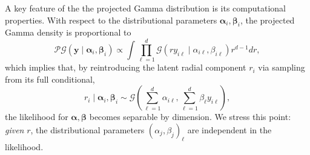 A key feature of the the projected Gamma distribution is its computational properties.  With respect to the distributional parameters $\bm{\alpha}_i,\bm{\beta}_i$, the projected Gamma density is proportional to
\begin{equation*}
    \mathcal{PG}(\bm{y}\mid\bm{\alpha}_i,\bm{\beta}_i) \propto \int\prod_{\ell = 1}^d\mathcal{G}\left(ry_{i\ell}\mid\alpha_{i\ell},\beta_{i\ell}\right)r^{d-1}dr,
\end{equation*}
which implies that, by reintroducing the latent radial component $r_i$ via sampling from its full conditional,
\begin{equation}
    r_i\mid\bm{\alpha}_i,\bm{\beta}_i \sim \mathcal{G}\left(\sum_{\ell = 1}^d\alpha_{i\ell}, \sum_{\ell = 1}^d\beta_{\ell} y_{i\ell}\right),
\end{equation}
the likelihood for $\bm{\alpha},\bm{\beta}$ becomes separable by dimension.  We stress this point: \emph{given} $r$, the distributional parameters $(\alpha_j,\beta_j)_{\ell}$ are independent in the likelihood.

